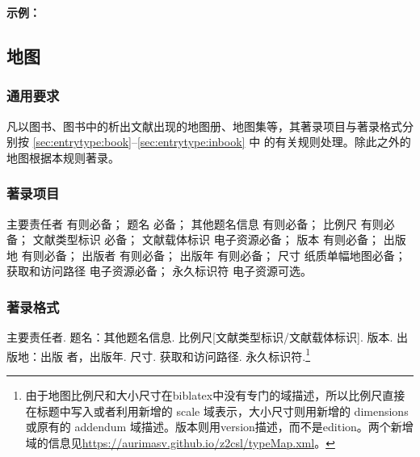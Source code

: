 \documentclass[twoside]{article}%
\begin{document}


\begin{refsection}
\nocite{李鸿章1887,湖北省建设厅1931,武汉市军事管制委员会1949,FITZWILLIAM1570,
中国第一历史档案馆2001--,清代奏折汇编2005,私立武昌2021}


\textbf{示例：}

{\printbibliography[heading=none,env=indentegenv]}

\end{refsection}


\subsection{地图}

\subsubsection{通用要求}

凡以图书、图书中的析出文献出现的地图册、地图集等，其著录项目与著录格式分别按 \ref{sec:entrytype:book}--\ref{sec:entrytype:inbook} 中
的有关规则处理。除此之外的地图根据本规则著录。

\subsubsection{著录项目}

主要责任者 有则必备；
题名 必备；
其他题名信息 有则必备；
比例尺 有则必备；
文献类型标识 必备；
文献载体标识 电子资源必备；
版本 有则必备；
出版地 有则必备；
出版者 有则必备；
出版年 有则必备；
尺寸 纸质单幅地图必备；
获取和访问路径 电子资源必备；
永久标识符 电子资源可选。

\subsubsection{著录格式}

主要责任者. 题名：其他题名信息. 比例尺[文献类型标识/文献载体标识]. 版本. 出版地：出版
者，出版年. 尺寸. 获取和访问路径. 永久标识符.\footnote{由于地图比例尺和大小尺寸在biblatex中没有专门的域描述，所以比例尺直接在标题中写入或者利用新增的 scale 域表示，大小尺寸则用新增的 dimensions 或原有的 addendum 域描述。版本则用version描述，而不是edition。两个新增域的信息见\url{https://aurimasv.github.io/z2csl/typeMap.xml}。}
\end{document}

